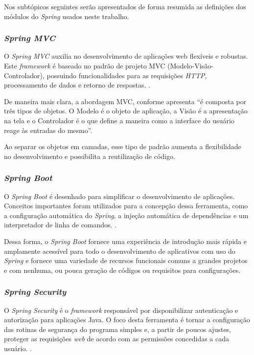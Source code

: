 Nos subtópicos seguintes serão apresentados de forma resumida as definições dos módulos do \textit{Spring} usados neste trabalho.

\subsubsection{\textit{Spring MVC}}
 O \textit{Spring MVC} auxilia no desenvolvimento de aplicações web flexíveis e robustas. Este \textit{framework} é baseado no padrão de projeto MVC (Modelo-Visão-Controlador), possuindo funcionalidades para as requisições \textit{HTTP}, processamento de dados e retorno de respostas. \cite{afonso}.
 
 De maneira mais clara, a abordagem MVC, conforme apresenta  ``é composta por três tipos de objetos. O Modelo é o objeto de aplicação, a Visão é a apresentação na tela e o Controlador é o que define a maneira como a interface do usuário reage às entradas do mesmo''.
 
 Ao separar os objetos em camadas, esse tipo de padrão aumenta a flexibilidade no desenvolvimento e possibilita a reutilização de código.
 
 \subsubsection{\textit{Spring Boot}}

O \textit{Spring Boot} é desenhado para simplificar o desenvolvimento de aplicações. Conceitos importantes foram utilizados para a concepção dessa ferramenta, como a configuração automática do \textit{Spring}, a injeção automática de dependências e um interpretador de linha de comandos. \cite{gutierrez}.

Dessa forma, o \textit{Spring Boot} fornece uma experiência de introdução mais rápida e amplamente acessível para todo o desenvolvimento de aplicativos com uso do \textit{Spring} e fornece uma variedade de recursos funcionais comuns a grandes projetos e com nenhuma, ou pouca geração de códigos ou requisitos para configurações.

\subsubsection{\textit{Spring Security}}

O \textit{Spring Security} é o \textit{framework} responsável por disponibilizar autenticação e autorização para aplicações Java. O foco desta ferramenta é tornar a configuração das rotinas de segurança do programa simples e, a partir de poucos ajustes, proteger as requisições \textit{web} de acordo com as permissões concedidas a cada usuário. \cite{afonso}.

